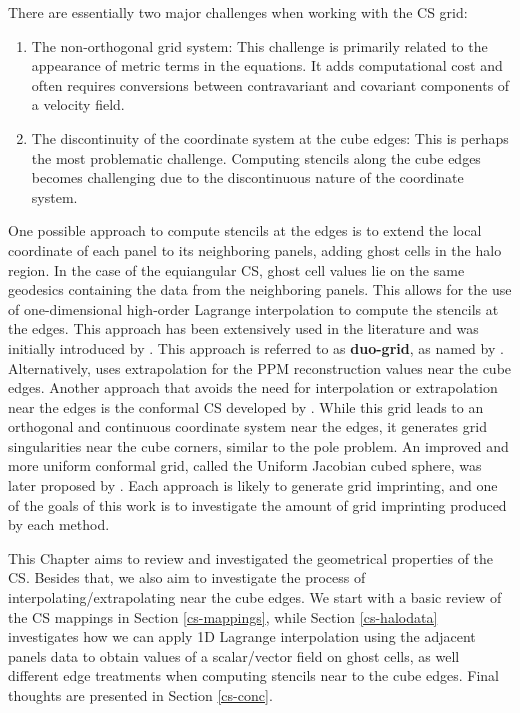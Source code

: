 There are essentially two major challenges when working with the CS grid:
\begin{enumerate}
\item
The non-orthogonal grid system: This challenge is primarily related to the appearance of
metric terms in the equations. It adds computational cost and often requires conversions
between contravariant and covariant components of a velocity field.
\item
The discontinuity of the coordinate system at the cube edges: This is perhaps the most 
problematic challenge. Computing stencils along the cube edges becomes challenging due to 
the discontinuous nature of the coordinate system.
\end{enumerate}
One possible approach to compute stencils at the edges is to extend the local coordinate 
of each panel to its neighboring panels, adding ghost cells in the halo region. In the 
case of the equiangular CS, ghost cell values lie on the same geodesics 
containing the data from the neighboring panels. This allows for the use of one-dimensional
high-order Lagrange interpolation to compute the stencils at the edges. 
This approach has been extensively used in the literature \citep{croisille:2013, 
katta:2015, katta:2015b, chen:2021} and was initially introduced by \citet{ronchi:1996}.
This approach is referred to as \textbf{duo-grid}, as named by \citet{chen:2021}.
Alternatively, \citet{putman:2007} uses extrapolation for the PPM reconstruction values near the cube edges.
Another approach that avoids the need for interpolation or extrapolation near the edges is 
the conformal CS developed by \citet{rancic:1996}. While this grid leads to an 
orthogonal and continuous coordinate system near the edges, it generates grid singularities
near the cube corners, similar to the pole problem. 
An improved and more uniform conformal grid, called the Uniform Jacobian cubed sphere, was 
later proposed by \citet{rancic:2017}.
Each approach is likely to generate grid imprinting, and one of the goals of this work is 
to investigate the amount of grid imprinting produced by each method.

This Chapter aims to review and investigated the geometrical properties
of the CS. Besides that, we also aim to investigate the process
of interpolating/extrapolating near the cube edges.
We start with a basic review of the CS mappings in Section \ref{cs-mappings},
while Section \ref{cs-halodata} investigates how we can apply 1D Lagrange interpolation using the adjacent panels
data to obtain values of a scalar/vector field on ghost cells, as well different edge
treatments when computing stencils near to the cube edges.
Final thoughts are presented in Section \ref{cs-conc}.

